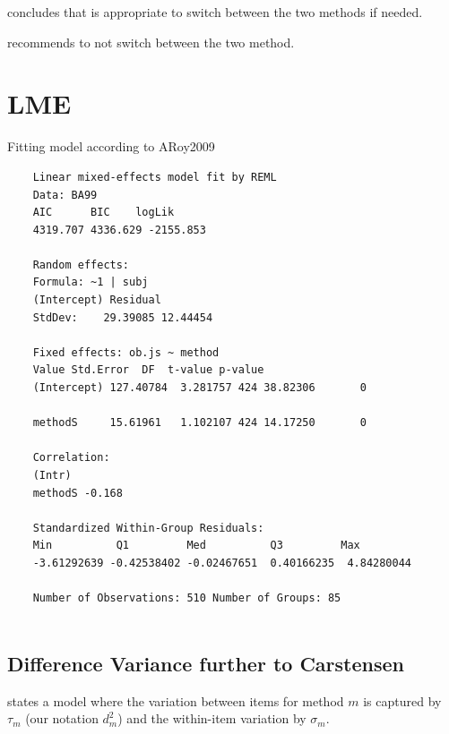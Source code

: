 \documentclass[12pt, a4paper]{report}
\theoremstyle{plain}
\theoremstyle{definition}
\theoremstyle{remark}
\begin{document}
	\citet{ARoy2009} concludes that is appropriate to switch between the two methods if needed.
	
	
	\citet{haber}
	
	\citet{ARoy2009} recommends to not switch between the two method.
	
	\section{LME}
	
	Fitting model according to ARoy2009
	
	\newpage
	\begin{verbatim}
	Linear mixed-effects model fit by REML
	Data: BA99
	AIC      BIC    logLik
	4319.707 4336.629 -2155.853
	
	Random effects:
	Formula: ~1 | subj
	(Intercept) Residual
	StdDev:    29.39085 12.44454
	
	Fixed effects: ob.js ~ method
	Value Std.Error  DF  t-value p-value
	(Intercept) 127.40784  3.281757 424 38.82306       0
	
	methodS     15.61961   1.102107 424 14.17250       0
	
	Correlation:
	(Intr)
	methodS -0.168
	
	Standardized Within-Group Residuals:
	Min          Q1         Med          Q3         Max
	-3.61292639 -0.42538402 -0.02467651  0.40166235  4.84280044
	
	Number of Observations: 510 Number of Groups: 85
	
	\end{verbatim}
	
	\newpage
	
	
	
	
	
	\newpage
	\subsection{Difference Variance further to Carstensen}
	
	\citet{BXC2008} states a model where the variation between items
	for method $m$ is captured by $\tau_m$ (our notation $d^2_m$) and the within-item
	variation by $\sigma_m$.
	
\end{document}
